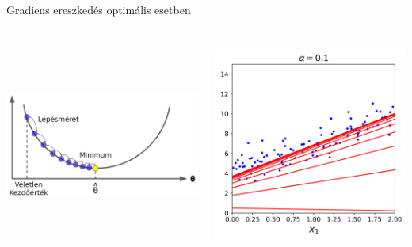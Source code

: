 \documentclass[english, aspectratio=169]{beamer}
\begin{document}
\begin{frame}{Gradiens ereszkedés optimális esetben}
\begin{columns}
\begin{column}{.5\textwidth}
\begin{center}
\includegraphics[width=7cm, height=7cm, keepaspectratio]{images/regresszio_20.png}
\end{center}
\end{column}
\begin{column}{.5\textwidth}
\begin{center}
\includegraphics[width=7cm, height=7cm, keepaspectratio]{images/regresszio_25.png}
\end{center}
\end{column}
\end{columns}
\end{frame}
\end{document}

